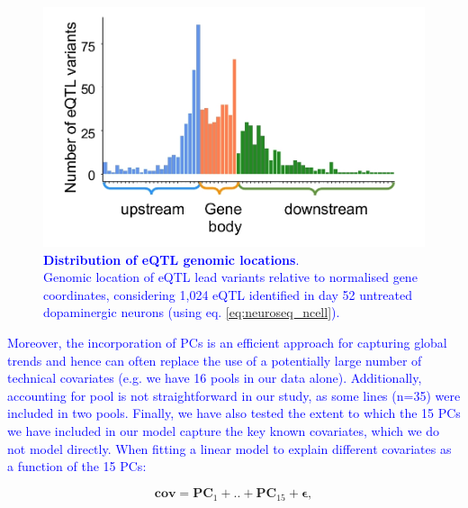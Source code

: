\begin{figure}[h]
\centering
\includegraphics[width=12cm]{Chapter5/Fig/TSS_distr.jpg}
\caption[Distribution of eQTL genomic locations]{\textcolor{blue}{\textbf{Distribution of eQTL genomic locations}.\\
Genomic location of eQTL lead variants relative to normalised gene coordinates, considering 1,024 eQTL identified in day 52 untreated dopaminergic neurons (using eq. \eqref{eq:neuroseq_ncell}).}}
\label{fig:neuroseq_eqtl_TSS}
\end{figure}


\textcolor{blue}{Moreover, the incorporation of PCs is an efficient approach for capturing global trends and hence can often replace the use of a potentially large number of technical covariates (e.g. we have 16 pools in our data alone).
Additionally, accounting for pool is not straightforward in our study, as some lines (n=35) were included in two pools. 
Finally, we have also tested the extent to which the 15 PCs we have included in our model capture the key known covariates, which we do not model directly. 
When fitting a linear model to explain different covariates as a function of the 15 PCs:}

\begin{equation}
    \mathbf{cov} = \mathbf{PC}_1 + .. + \mathbf{PC}_{15} + \boldsymbol{\epsilon},
\end{equation}

